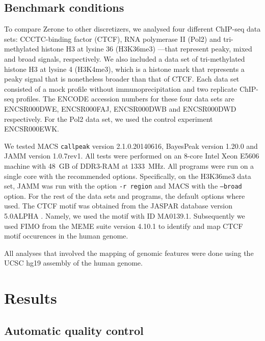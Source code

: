 \documentclass{bioinfo}
\begin{document}
\begin{methods}
\subsection{Benchmark conditions}
\label{sub:bench_cond}
To compare Zerone to other discretizers, we analysed four different
ChIP-seq data sets: CCCTC-binding factor (CTCF), RNA polymerase II
(Pol2) and tri-methylated histone H3 at lysine 36 (H3K36me3) ---that
represent peaky, mixed and broad signals, respectively. We also included a
data set of tri-methylated histone H3 at lysine 4 (H3K4me3), which is a
histone mark that represents a peaky signal that is nonetheless broader than
that of CTCF.
Each data set consisted of a mock profile without immunoprecipitation
and two replicate ChIP-seq profiles.
The ENCODE accession numbers for these four data sets are
ENCSR000DWE, ENCSR000FAJ, ENCSR000DWB and ENCSR000DWD respectively.
For the Pol2 data set, we used the control experiment ENCSR000EWK.

We tested MACS \texttt{callpeak} version 2.1.0.20140616, BayesPeak
version 1.20.0 and JAMM version 1.0.7rev1. All tests were performed on
an 8-core Intel Xeon E5606 machine with 48~GB of DDR3-RAM at 1333~MHz.
All programs were run on a single core with the recommended options.
Specifically, on the H3K36me3 data set, JAMM was run with the option
\texttt{-r region} and MACS with the \texttt{--broad} option. For the rest of
the data sets and programs, the default options where used.
The CTCF motif was obtained from the JASPAR database version
5.0{\textunderscore}ALPHA \citep{pmid24194598}. Namely, we used the motif
with ID MA0139.1.
Subsequently we used FIMO \citep{pmid21330290} from the MEME suite version
4.10.1 \citep{pmid19458158} to identify and map CTCF motif occurences in the
human genome.

All analyses that involved the mapping of genomic features were done using the
UCSC hg19 assembly of the human genome.

\end{methods}

\section{Results}
\label{sec:results}

\subsection{Automatic quality control}
\end{document}

